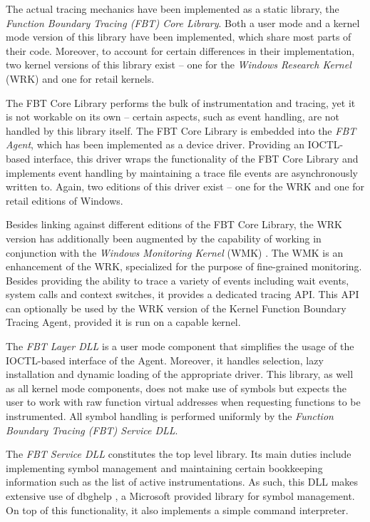 The actual tracing mechanics have been implemented as a static library,
the \emph{Function Boundary Tracing (FBT) Core Library}. Both a user mode and
a kernel mode version of this library have been implemented, which share most parts
of their code. Moreover, to account for certain differences in their implementation, 
two kernel versions of this library exist -- one for the \emph{Windows Research Kernel} (WRK) 
\cite{Polze06} and one for retail kernels.

The FBT Core Library performs the bulk of instrumentation and tracing, yet it is not workable
on its own -- certain aspects, such as event handling,
are not handled by this library itself. The FBT Core Library
is embedded into the \emph{FBT Agent}, which
has been implemented as a device driver. Providing an IOCTL-based interface,
this driver wraps the functionality of the FBT Core Library and implements 
event handling by maintaining a trace file events are asynchronously written to. 
Again, two editions of this driver exist -- one for the WRK and
one for retail editions of Windows.

Besides linking against different editions of the FBT Core Library, the WRK version
has additionally been augmented by the capability of working in conjunction with
the \emph{Windows Monitoring Kernel} (WMK) \cite{Schmidt08}. The WMK is an enhancement of the WRK,
specialized for the purpose of fine-grained monitoring. Besides providing the ability
to trace a variety of events including wait events, system calls and context switches, 
it provides a dedicated tracing API. This API can optionally be used by the WRK 
version of the Kernel Function Boundary Tracing Agent, provided it is 
run on a capable kernel.

The \emph{FBT Layer DLL} is a user mode component
that simplifies the usage of the IOCTL-based interface of the Agent. Moreover, it handles
selection, lazy installation and dynamic loading of the appropriate driver. This
library, as well as all kernel mode components, does not make use of symbols but 
expects the user to work with raw function virtual addresses when requesting
functions to be instrumented. All symbol handling is performed uniformly by the 
\emph{Function Boundary Tracing (FBT) Service DLL}.

The \emph{FBT Service DLL} constitutes the top level
library. Its main duties include implementing symbol management and maintaining certain
bookkeeping information such as the list of active instrumentations. 
As such, this DLL makes extensive use of dbghelp \cite{DbgHelp}, a Microsoft 
provided library for symbol management. On top of this functionality, it also implements a simple 
command interpreter.

